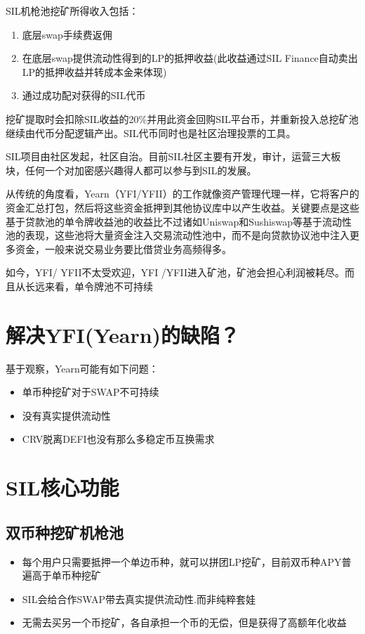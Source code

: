 \documentclass[11pt,letterpaper]{article}
\begin{document}
\begin{multicols}{2}
SIL机枪池挖矿所得收入包括：
\begin{enumerate}
    \item 底层swap手续费返佣
    \item 在底层swap提供流动性得到的LP的抵押收益(此收益通过SIL Finance自动卖出LP的抵押收益并转成本金来体现)
    \item 通过成功配对获得的SIL代币
\end{enumerate}
挖矿提取时会扣除SIL收益的20\%并用此资金回购SIL平台币，并重新投入总挖矿池继续由代币分配逻辑产出。SIL代币同时也是社区治理投票的工具。

SIL项目由社区发起，社区自治。目前SIL社区主要有开发，审计，运营三大板块，任何一个对加密感兴趣得人都可以参与到SIL的发展。

从传统的角度看，Yearn（YFI/YFII）的工作就像资产管理代理一样，它将客户的资金汇总打包，然后将这些资金抵押到其他协议库中以产生收益。关键要点是这些基于贷款池的单令牌收益池的收益比不过诸如Uniswap和Sushiswap等基于流动性池的表现，这些池将大量资金注入交易流动性池中，而不是向贷款协议池中注入更多资金，一般来说交易业务要比借贷业务高频得多。

如今，YFI/ YFII不太受欢迎，YFI /YFII进入矿池，矿池会担心利润被耗尽。而且从长远来看，单令牌池不可持续

\section{解决YFI(Yearn)的缺陷？}
基于观察，Yearn可能有如下问题：
\begin{itemize}
  \item 单币种挖矿对于SWAP不可持续
  \item 没有真实提供流动性
  \item CRV脱离DEFI也没有那么多稳定币互换需求
\end{itemize}

\section{SIL核心功能}

\subsection{双币种挖矿机枪池}
\begin{itemize}
  \item 每个用户只需要抵押一个单边币种，就可以拼团LP挖矿，目前双币种APY普遍高于单币种挖矿
  \item SIL会给合作SWAP带去真实提供流动性.而非纯粹套娃
  \item 无需去买另一个币挖矿，各自承担一个币的无偿，但是获得了高额年化收益
\end{itemize}


\end{multicols}
\end{document}
